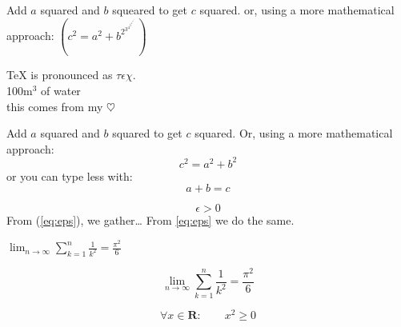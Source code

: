 \documentclass{article}
\begin{document}
Add $a$ squared and $b$ squeared
to get $c$ squared. or, using a
more mathematical approach:
$\left(c^{2}=a^{2}+b^{2^{3^{4^{5^{6^{7^{8^{9^{10^{11^a{^b{^c{^d}}}}}}}}}}}}}\right)$


\TeX{} is pronounced as
\(\tau\epsilon\chi\). \\[6pt]
100m$^{3}$ of water\\[6pt]
this comes from my
\begin{math}
  \heartsuit
\end{math}


  Add $a$ squared and $b$ squared
  to get $c$ squared. Or, using
  a more mathematical approach:
  \begin{displaymath}
    c^{2}=a^{2}+b^{2}
  \end{displaymath}
  or you can type less with:
  \[a+b=c\]


  \begin{equation} \label{eq:eps}
    \epsilon > 0
  \end{equation}
  From (\ref{eq:eps}), we gather\ldots{}
  From \eqref{eq:eps} we
  do the same.

  \begin{flushright}
  $\lim_{n \to \infty}
  \sum_{k=1}^n \frac{1}{k^2}
  = \frac{\pi^2}{6}$
  \end{flushright}

  \begin{displaymath} \label{eq:eps}
    \lim_{n \to \infty}
    \sum_{k=1}^n \frac{1}{k^2}
    = \frac{\pi^2}{6}
  \end{displaymath}

  \begin{equation}
    \forall x \in \mathbf{R}:
    \qquad x^{2} \geq 0
  \end{equation}
\end{document}

